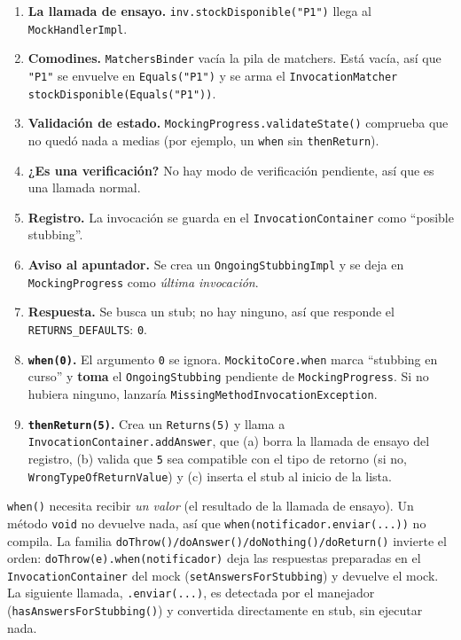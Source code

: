 \documentclass[11pt,a4paper,oneside]{report}
\newcommand{\code}[1]{\texttt{#1}}
\begin{document}
\begin{enumerate}
  \item \textbf{La llamada de ensayo.} \code{inv.stockDisponible("P1")} llega al \code{MockHandlerImpl}.
  \item \textbf{Comodines.} \code{MatchersBinder} vacía la pila de matchers. Está vacía, así que \code{"P1"} se envuelve en \code{Equals("P1")} y se arma el \code{InvocationMatcher} \code{stockDisponible(Equals("P1"))}.
  \item \textbf{Validación de estado.} \code{MockingProgress.validateState()} comprueba que no quedó nada a medias (por ejemplo, un \code{when} sin \code{thenReturn}).
  \item \textbf{¿Es una verificación?} No hay modo de verificación pendiente, así que es una llamada normal.
  \item \textbf{Registro.} La invocación se guarda en el \code{InvocationContainer} como ``posible stubbing''.
  \item \textbf{Aviso al apuntador.} Se crea un \code{OngoingStubbingImpl} y se deja en \code{MockingProgress} como \emph{última invocación}.
  \item \textbf{Respuesta.} Se busca un stub; no hay ninguno, así que responde el \code{RETURNS\_DEFAULTS}: \code{0}.
  \item \textbf{\code{when(0)}.} El argumento \code{0} se ignora. \code{MockitoCore.when} marca ``stubbing en curso'' y \textbf{toma} el \code{OngoingStubbing} pendiente de \code{MockingProgress}. Si no hubiera ninguno, lanzaría \code{MissingMethodInvocationException}.
  \item \textbf{\code{thenReturn(5)}.} Crea un \code{Returns(5)} y llama a \code{InvocationContainer.addAnswer}, que (a) borra la llamada de ensayo del registro, (b) valida que \code{5} sea compatible con el tipo de retorno (si no, \code{WrongTypeOfReturnValue}) y (c) inserta el stub al inicio de la lista.
\end{enumerate}

\begin{idea}[Por qué los métodos \code{void} usan \code{doXxx()}]
\code{when()} necesita recibir \emph{un valor} (el resultado de la llamada de ensayo). Un método \code{void} no devuelve nada, así que \code{when(notificador.enviar(...))} no compila. La familia \code{doThrow()/doAnswer()/doNothing()/doReturn()} invierte el orden: \code{doThrow(e).when(notificador)} deja las respuestas preparadas en el \code{InvocationContainer} del mock (\code{setAnswersForStubbing}) y devuelve el mock. La siguiente llamada, \code{.enviar(...)}, es detectada por el manejador (\code{hasAnswersForStubbing()}) y convertida directamente en stub, sin ejecutar nada.
\end{idea}
\end{document}
